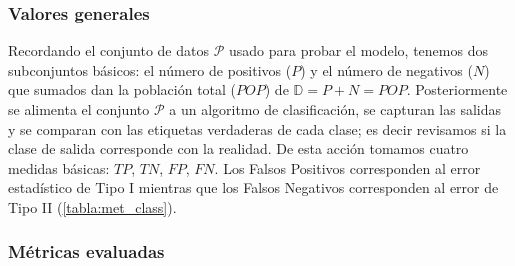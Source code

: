 \subsubsection{Valores generales}

Recordando el conjunto de datos \(\mathcal{P}\) usado para probar el modelo,
tenemos dos subconjuntos básicos: el número de positivos (\(P\)) y el número de
negativos (\(N\)) que sumados dan la población total (\(POP\)) de \( \mathbb{D} = P
+ N = POP\). Posteriormente se alimenta el conjunto \(\mathcal{P}\) a un algoritmo
de clasificación, se capturan las salidas y se comparan con las etiquetas
verdaderas de cada clase; es decir revisamos si la clase de salida corresponde
con la realidad. De esta acción tomamos cuatro medidas básicas: \(TP\), \(TN\),
\(FP\), \(FN\). Los Falsos Positivos corresponden al error estadístico de Tipo I
mientras que los Falsos Negativos corresponden al error de Tipo II
(\autoref{tabla:met_class}).

\begin{table}[H]
    \centering
    \caption{Valores generales de un problema de clasificación}\label{tabla:met_class}
    \end{table}

\subsubsection{Métricas evaluadas}

